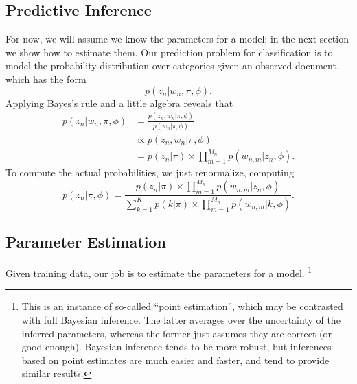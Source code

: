 \subsection{Predictive Inference}

For now, we will assume we know the parameters for a model; in
the next section we show how to estimate them.  Our prediction
problem for classification is to model the probability distribution
over categories given an observed document, which has the form
%
\begin{equation}
p(z_n | w_n, \pi, \phi).
\end{equation}
%
Applying Bayes's rule and a little algebra reveals that
%
\begin{align}
p(z_n|w_n, \pi, \phi) 
&{} = \frac{p(z_n,w_n|\pi,\phi)}{p(w_n|\pi,\phi)}
\\[6pt]
&{} \propto p(z_n,w_n|\pi,\phi)
\\[3pt]
&{} = p(z_n|\pi) \times \prod_{m=1}^{M_n} p(w_{n,m}|z_n,\phi).
\end{align}
%
To compute the actual probabilities, we just renormalize,
computing 
%
\begin{equation}
p(z_n|\pi,\phi) 
= \frac{p(z_n|\pi) \times \prod_{m=1}^{M_n} p(w_{n,m}|z_n,\phi)}
       {\sum_{k=1}^K p(k|\pi) \times \prod_{m=1}^{M_n} p(w_{n,m}|k,\phi)}.
\end{equation}


\subsection{Parameter Estimation}\label{section:naive-bayes-map}

Given training data, our job is to estimate the parameters for
a model.%
%
\footnote{This is an instance of so-called ``point estimation'', which
  may be contrasted with full Bayesian inference.  The latter averages
  over the uncertainty of the inferred parameters, whereas the former
  just assumes they are correct (or good enough).  Bayesian inference
  tends to be more robust, but inferences based on point estimates
  are much easier and faster, and tend to provide similar results.}


